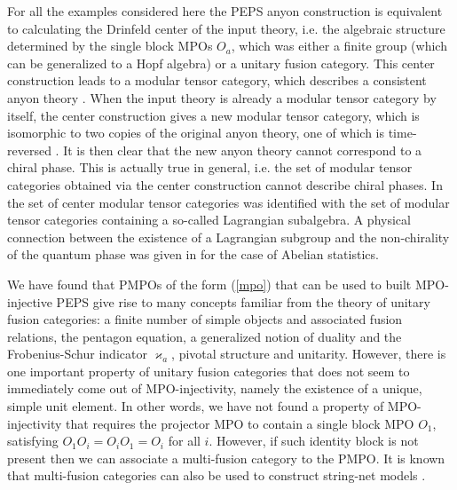 \documentclass[12 pt]{article}
\begin{document}
For all the examples considered here the PEPS anyon construction is equivalent to calculating the Drinfeld center \cite{drinfeld} of the input theory, i.e. the algebraic structure determined by the single block MPOs $O_a$, which was either a finite group (which can be generalized to a Hopf algebra) or a unitary fusion category. This center construction leads to a modular tensor category, which describes a consistent anyon theory \cite{DrinfeldCenter}. When the input theory is already a modular tensor category by itself, the center construction gives a new modular tensor category, which is isomorphic to two copies of the original anyon theory, one of which is time-reversed  \cite{DrinfeldCenter}. It is then clear that the new anyon theory cannot correspond to a chiral phase. This is actually true in general, i.e. the set of modular tensor categories obtained via the center construction cannot describe chiral phases.  In \cite{LagrangianAlgebra} the set of center modular tensor categories was identified with the set of modular tensor categories containing a so-called Lagrangian subalgebra. A physical connection between the existence of a Lagrangian subgroup and the non-chirality of the quantum phase was given in \cite{LevinEdges} for the case of Abelian statistics.

We have found that PMPOs of the form (\ref{mpo}) that can be used to built MPO-injective PEPS give rise to many concepts familiar from the theory of unitary fusion categories: a finite number of simple objects and associated fusion relations, the pentagon equation, a generalized notion of duality and the Frobenius-Schur indicator $\varkappa_a$, pivotal structure and unitarity. However, there is one important property of unitary fusion categories that does not seem to immediately come out of MPO-injectivity, namely the existence of a unique, simple unit element. In other words, we have not found a property of MPO-injectivity that requires the projector MPO to contain a single block MPO $O_1$, satisfying $O_1O_i = O_iO_1 = O_i$ for all $i$. However, if such identity block is not present then we can associate a multi-fusion category to the PMPO. It is known that multi-fusion categories can also be used to construct string-net models \cite{EnrichingLevinWen}. 
\end{document}
